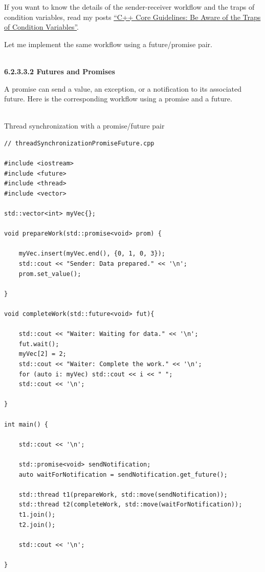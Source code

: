 If you want to know the details of the sender-receiver workflow and the traps of condition variables, read my posts \href{https://www.modernescpp.com/index.php/c-core-guidelines-be-aware-of-the-traps-of-condition-variables}{“C++ Core Guidelines: Be Aware of the Traps of Condition Variables”}.

Let me implement the same workflow using a future/promise pair.

\hspace*{\fill} \\ %
\noindent
\textbf{6.2.3.3.2\hspace{0.2cm} Futures and Promises}

A promise can send a value, an exception, or a notification to its associated future. Here is the corresponding workflow using a promise and a future.

\hspace*{\fill} \\ %
\noindent
Thread synchronization with a promise/future pair
\begin{lstlisting}[style=styleCXX]
// threadSynchronizationPromiseFuture.cpp

#include <iostream>
#include <future>
#include <thread>
#include <vector>

std::vector<int> myVec{};

void prepareWork(std::promise<void> prom) {
	
	myVec.insert(myVec.end(), {0, 1, 0, 3});
	std::cout << "Sender: Data prepared." << '\n';
	prom.set_value();

}

void completeWork(std::future<void> fut){

	std::cout << "Waiter: Waiting for data." << '\n';
	fut.wait();
	myVec[2] = 2;
	std::cout << "Waiter: Complete the work." << '\n';
	for (auto i: myVec) std::cout << i << " ";
	std::cout << '\n';

}

int main() {

	std::cout << '\n';
	
	std::promise<void> sendNotification;
	auto waitForNotification = sendNotification.get_future();
	
	std::thread t1(prepareWork, std::move(sendNotification));
	std::thread t2(completeWork, std::move(waitForNotification));
	t1.join();
	t2.join();
	
	std::cout << '\n';

}
\end{lstlisting}

